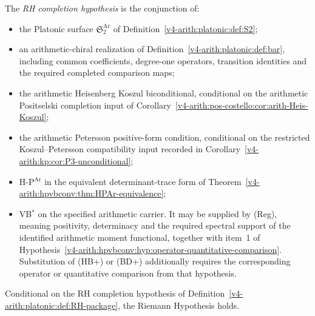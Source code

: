 \begin{definition}
\label{v4-arith:platonic:def:RH-package}
The \emph{RH completion hypothesis}
is the conjunction of:
\begin{itemize}
\item the Platonic surface \(\mathfrak{S}^{\mathrm{Ar}}_{2}\) of
Definition~\ref{v4-arith:platonic:def:S2};
\item an arithmetic-chiral realization of Definition~\ref{v4-arith:platonic:def:bar},
including common coefficients, degree-one operators, transition
identities and the required completed comparison maps;
\item the arithmetic Heisenberg Koszul biconditional, conditional on
the arithmetic Positselski completion input of
Corollary~\ref{v4-arith:pos-costello:cor:arith-Heis-Koszul};
\item the arithmetic Petersson positive-form condition, conditional on
the restricted Koszul--Petersson compatibility input recorded in
Corollary~\ref{v4-arith:kp:cor:P3-unconditional};
\item H-P\(^{\mathrm{Ar}}\) in the equivalent determinant-trace
form of Theorem~\ref{v4-arith:hpvbconv:thm:HPAr-equivalence};
\item VB\(^{*}\) on the specified arithmetic carrier. It may be
supplied by (Reg), meaning positivity, determinacy and the required
spectral support of the identified arithmetic moment functional,
together with item~1 of
Hypothesis~\ref{v4-arith:hpvbconv:hyp:operator-quantitative-comparison}.
Substitution of (HB+) or (BD+) additionally requires the corresponding
operator or quantitative comparison from that hypothesis.
\end{itemize}
\end{definition}

\begin{theorem}
\label{v4-arith:platonic:thm:RH-completion}
Conditional on the RH completion
hypothesis of Definition~\ref{v4-arith:platonic:def:RH-package}, the Riemann
Hypothesis holds.
\end{theorem}

